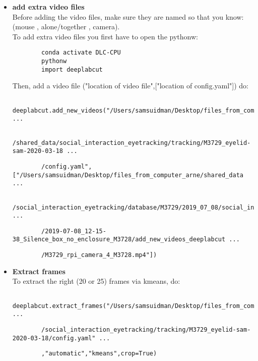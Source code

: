 \documentclass{article}
\begin{document}
\begin{itemize}
    \item \textbf{add extra video files} \\
    Before adding the video files, make sure they are named so that you know: (mouse , alone/together , camera). \\
    To add extra video files you first have to open the pythonw:
    \begin{verbatim}
        conda activate DLC-CPU
        pythonw
        import deeplabcut
    \end{verbatim}
    Then, add a video file ("location of video file",["location of config.yaml"]) do:
    \begin{verbatim}
        deeplabcut.add_new_videos("/Users/samsuidman/Desktop/files_from_computer_arne ...
    \end{verbatim}
    \begin{verbatim}
        /shared_data/social_interaction_eyetracking/tracking/M3729_eyelid-sam-2020-03-18 ...
    \end{verbatim}
    \begin{verbatim}
        /config.yaml",["/Users/samsuidman/Desktop/files_from_computer_arne/shared_data ...
    \end{verbatim}
    \begin{verbatim}
        /social_interaction_eyetracking/database/M3729/2019_07_08/social_interaction ...
    \end{verbatim}
    \begin{verbatim}
        /2019-07-08_12-15-38_Silence_box_no_enclosure_M3728/add_new_videos_deeplabcut ...
    \end{verbatim}
    \begin{verbatim}
        /M3729_rpi_camera_4_M3728.mp4"])
    \end{verbatim}
    
    \item \textbf{Extract frames} \\
    To extract the right (20 or 25) frames via kmeans, do:
    \begin{verbatim}
        deeplabcut.extract_frames("/Users/samsuidman/Desktop/files_from_computer_arne/shared_data ...
    \end{verbatim}
    \begin{verbatim}
        /social_interaction_eyetracking/tracking/M3729_eyelid-sam-2020-03-18/config.yaml" ...
    \end{verbatim}
    \begin{verbatim}
        ,"automatic","kmeans",crop=True)
    \end{verbatim}
    

\end{itemize}
\end{document}
